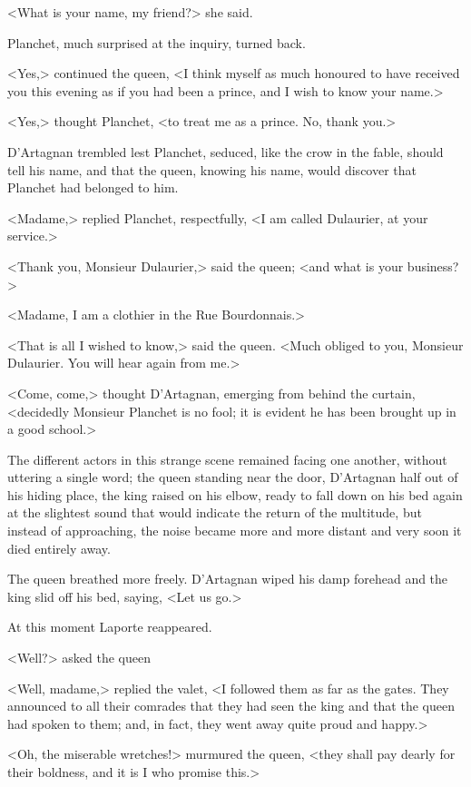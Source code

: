 <What is your name, my friend?> she said.

Planchet, much surprised at the inquiry, turned back.

<Yes,> continued the queen, <I think myself as much honoured to have received you this evening as if you had been a prince, and I wish to know your name.>

<Yes,> thought Planchet, <to treat me as a prince. No, thank you.>

D'Artagnan trembled lest Planchet, seduced, like the crow in the fable, should tell his name, and that the queen, knowing his name, would discover that Planchet had belonged to him.

<Madame,> replied Planchet, respectfully, <I am called Dulaurier, at your service.>

<Thank you, Monsieur Dulaurier,> said the queen; <and what is your business?>

<Madame, I am a clothier in the Rue Bourdonnais.>

<That is all I wished to know,> said the queen. <Much obliged to you, Monsieur Dulaurier. You will hear again from me.>

<Come, come,> thought D'Artagnan, emerging from behind the curtain, <decidedly Monsieur Planchet is no fool; it is evident he has been brought up in a good school.>

The different actors in this strange scene remained facing one another, without uttering a single word; the queen standing near the door, D'Artagnan half out of his hiding place, the king raised on his elbow, ready to fall down on his bed again at the slightest sound that would indicate the return of the multitude, but instead of approaching, the noise became more and more distant and very soon it died entirely away.

The queen breathed more freely. D'Artagnan wiped his damp forehead and the king slid off his bed, saying, <Let us go.>

At this moment Laporte reappeared.

<Well?> asked the queen

<Well, madame,> replied the valet, <I followed them as far as the gates. They announced to all their comrades that they had seen the king and that the queen had spoken to them; and, in fact, they went away quite proud and happy.>

<Oh, the miserable wretches!> murmured the queen, <they shall pay dearly for their boldness, and it is I who promise this.>

